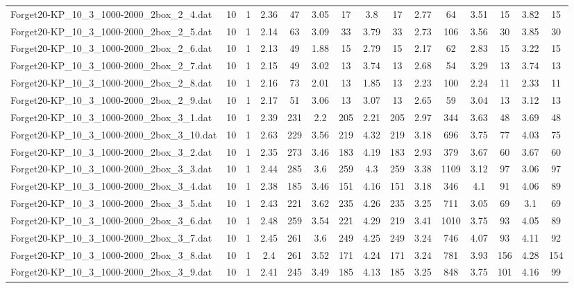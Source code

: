 \begin{table}[!ht]
{\begin{tabular}{lcccccccccccccc}
Forget20-KP\_10\_3\_1000-2000\_2box\_2\_4.dat & 10 & 1 & 2.36 & 47 & 3.05 & 17 & 3.8 & 17 & 2.77 & 64 & 3.51 & 15 & 3.82 & 15 \\
Forget20-KP\_10\_3\_1000-2000\_2box\_2\_5.dat & 10 & 1 & 2.14 & 63 & 3.09 & 33 & 3.79 & 33 & 2.73 & 106 & 3.56 & 30 & 3.85 & 30 \\
Forget20-KP\_10\_3\_1000-2000\_2box\_2\_6.dat & 10 & 1 & 2.13 & 49 & 1.88 & 15 & 2.79 & 15 & 2.17 & 62 & 2.83 & 15 & 3.22 & 15 \\
Forget20-KP\_10\_3\_1000-2000\_2box\_2\_7.dat & 10 & 1 & 2.15 & 49 & 3.02 & 13 & 3.74 & 13 & 2.68 & 54 & 3.29 & 13 & 3.74 & 13 \\
Forget20-KP\_10\_3\_1000-2000\_2box\_2\_8.dat & 10 & 1 & 2.16 & 73 & 2.01 & 13 & 1.85 & 13 & 2.23 & 100 & 2.24 & 11 & 2.33 & 11 \\
Forget20-KP\_10\_3\_1000-2000\_2box\_2\_9.dat & 10 & 1 & 2.17 & 51 & 3.06 & 13 & 3.07 & 13 & 2.65 & 59 & 3.04 & 13 & 3.12 & 13 \\
Forget20-KP\_10\_3\_1000-2000\_2box\_3\_1.dat & 10 & 1 & 2.39 & 231 & 2.2 & 205 & 2.21 & 205 & 2.97 & 344 & 3.63 & 48 & 3.69 & 48 \\
Forget20-KP\_10\_3\_1000-2000\_2box\_3\_10.dat & 10 & 1 & 2.63 & 229 & 3.56 & 219 & 4.32 & 219 & 3.18 & 696 & 3.75 & 77 & 4.03 & 75 \\
Forget20-KP\_10\_3\_1000-2000\_2box\_3\_2.dat & 10 & 1 & 2.35 & 273 & 3.46 & 183 & 4.19 & 183 & 2.93 & 379 & 3.67 & 60 & 3.67 & 60 \\
Forget20-KP\_10\_3\_1000-2000\_2box\_3\_3.dat & 10 & 1 & 2.44 & 285 & 3.6 & 259 & 4.3 & 259 & 3.38 & 1109 & 3.12 & 97 & 3.06 & 97 \\
Forget20-KP\_10\_3\_1000-2000\_2box\_3\_4.dat & 10 & 1 & 2.38 & 185 & 3.46 & 151 & 4.16 & 151 & 3.18 & 346 & 4.1 & 91 & 4.06 & 89 \\
Forget20-KP\_10\_3\_1000-2000\_2box\_3\_5.dat & 10 & 1 & 2.43 & 221 & 3.62 & 235 & 4.26 & 235 & 3.25 & 711 & 3.05 & 69 & 3.1 & 69 \\
Forget20-KP\_10\_3\_1000-2000\_2box\_3\_6.dat & 10 & 1 & 2.48 & 259 & 3.54 & 221 & 4.29 & 219 & 3.41 & 1010 & 3.75 & 93 & 4.05 & 89 \\
Forget20-KP\_10\_3\_1000-2000\_2box\_3\_7.dat & 10 & 1 & 2.45 & 261 & 3.6 & 249 & 4.25 & 249 & 3.24 & 746 & 4.07 & 93 & 4.11 & 92 \\
Forget20-KP\_10\_3\_1000-2000\_2box\_3\_8.dat & 10 & 1 & 2.4 & 261 & 3.52 & 171 & 4.24 & 171 & 3.24 & 781 & 3.93 & 156 & 4.28 & 154 \\
Forget20-KP\_10\_3\_1000-2000\_2box\_3\_9.dat & 10 & 1 & 2.41 & 245 & 3.49 & 185 & 4.13 & 185 & 3.25 & 848 & 3.75 & 101 & 4.16 & 99 \\

\end{tabular}}
\end{table}
